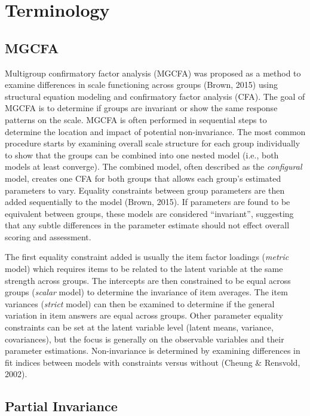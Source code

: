 \documentclass[
  man]{apa7}
\begin{document}
\section{Terminology}\label{terminology}

\subsection{MGCFA}\label{mgcfa}

Multigroup confirmatory factor analysis (MGCFA) was proposed as a method to examine differences in scale functioning across groups (Brown, 2015) using structural equation modeling and confirmatory factor analysis (CFA). The goal of MGCFA is to determine if groups are invariant or show the same response patterns on the scale. MGCFA is often performed in sequential steps to determine the location and impact of potential non-invariance. The most common procedure starts by examining overall scale structure for each group individually to show that the groups can be combined into one nested model (i.e., both models at least converge). The combined model, often described as the \emph{configural} model, creates one CFA for both groups that allows each group's estimated parameters to vary. Equality constraints between group parameters are then added sequentially to the model (Brown, 2015). If parameters are found to be equivalent between groups, these models are considered ``invariant'', suggesting that any subtle differences in the parameter estimate should not effect overall scoring and assessment.

The first equality constraint added is usually the item factor loadings (\emph{metric} model) which requires items to be related to the latent variable at the same strength across groups. The intercepts are then constrained to be equal across groups (\emph{scalar} model) to determine the invariance of item averages. The item variances (\emph{strict} model) can then be examined to determine if the general variation in item answers are equal across groups. Other parameter equality constraints can be set at the latent variable level (latent means, variance, covariances), but the focus is generally on the observable variables and their parameter estimations. Non-invariance is determined by examining differences in fit indices between models with constraints versus without (Cheung \& Rensvold, 2002).

\subsection{Partial Invariance}\label{partial-invariance}
\end{document}
